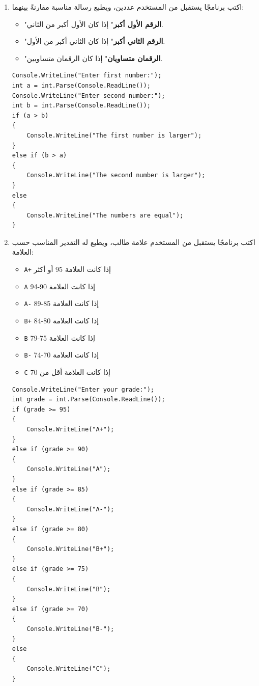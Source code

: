 \documentclass[14pt]{extarticle}
\begin{document}
\begin{enumerate}[resume, itemsep=2em]
\filbreak
\item
اكتب برنامجًا يستقبل من المستخدم عددين، ويطبع رسالة مناسبة مقارنةً بينهما:
\begin{itemize}
\item "\textbf{الرقم الأول أكبر}" إذا كان الأول أكبر من الثاني.
\item "\textbf{الرقم الثاني أكبر}" إذا كان الثاني أكبر من الأول.
\item "\textbf{الرقمان متساويان}" إذا كان الرقمان متساويين.
\end{itemize}
\ifwithsols
\begin{boxSolution}
\begin{english}
\begin{verbatim}
Console.WriteLine("Enter first number:");
int a = int.Parse(Console.ReadLine());
Console.WriteLine("Enter second number:");
int b = int.Parse(Console.ReadLine());
if (a > b)
{
    Console.WriteLine("The first number is larger");
}
else if (b > a)
{
    Console.WriteLine("The second number is larger");
}
else
{
    Console.WriteLine("The numbers are equal");
}
\end{verbatim}
\end{english}
\end{boxSolution}
\fi

\filbreak
\item
اكتب برنامجًا يستقبل من المستخدم علامة طالب، ويطبع له التقدير المناسب حسب العلامة:
\begin{itemize}
\item \texttt{A+} إذا كانت العلامة 95 أو أكثر
\item \texttt{A} إذا كانت العلامة 90-94
\item \texttt{A-} إذا كانت العلامة 85-89
\item \texttt{B+} إذا كانت العلامة 80-84
\item \texttt{B} إذا كانت العلامة 75-79
\item \texttt{B-} إذا كانت العلامة 70-74
\item \texttt{C} إذا كانت العلامة أقل من 70
\end{itemize}
\ifwithsols
\begin{boxSolution}
\begin{english}
\begin{verbatim}
Console.WriteLine("Enter your grade:");
int grade = int.Parse(Console.ReadLine());
if (grade >= 95)
{
    Console.WriteLine("A+");
}
else if (grade >= 90)
{
    Console.WriteLine("A");
}
else if (grade >= 85)
{
    Console.WriteLine("A-");
}
else if (grade >= 80)
{
    Console.WriteLine("B+");
}
else if (grade >= 75)
{
    Console.WriteLine("B");
}
else if (grade >= 70)
{
    Console.WriteLine("B-");
}
else
{
    Console.WriteLine("C");
}
\end{verbatim}
\end{english}
\end{boxSolution}
\fi

\end{enumerate}
\end{document}
